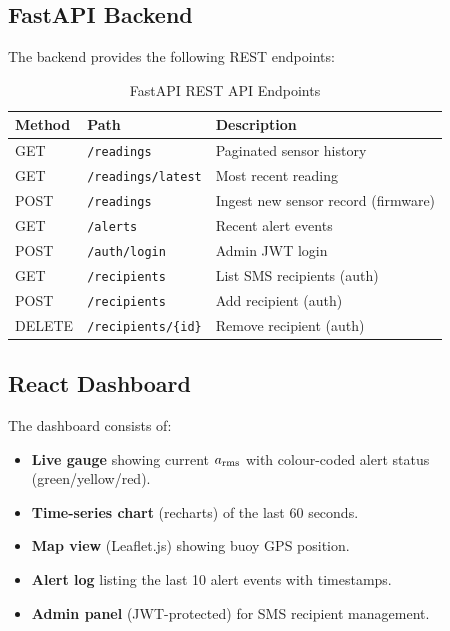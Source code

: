\subsection{FastAPI Backend}

The backend provides the following REST endpoints:

\begin{table}[H]
\centering
\caption{FastAPI REST API Endpoints}
\label{tab:api}
\begin{tabular}{lll}
\toprule
\textbf{Method} & \textbf{Path}            & \textbf{Description} \\
\midrule
GET    & \texttt{/readings}          & Paginated sensor history \\
GET    & \texttt{/readings/latest}   & Most recent reading \\
POST   & \texttt{/readings}          & Ingest new sensor record (firmware) \\
GET    & \texttt{/alerts}            & Recent alert events \\
POST   & \texttt{/auth/login}        & Admin JWT login \\
GET    & \texttt{/recipients}        & List SMS recipients (auth) \\
POST   & \texttt{/recipients}        & Add recipient (auth) \\
DELETE & \texttt{/recipients/\{id\}} & Remove recipient (auth) \\
\bottomrule
\end{tabular}
\end{table}

\subsection{React Dashboard}

The dashboard consists of:
\begin{itemize}
  \item \textbf{Live gauge} showing current $a_{\rm rms}$ with colour-coded alert
        status (green/yellow/red).
  \item \textbf{Time-series chart} (recharts) of the last 60 seconds.
  \item \textbf{Map view} (Leaflet.js) showing buoy GPS position.
  \item \textbf{Alert log} listing the last 10 alert events with timestamps.
  \item \textbf{Admin panel} (JWT-protected) for SMS recipient management.
\end{itemize}

